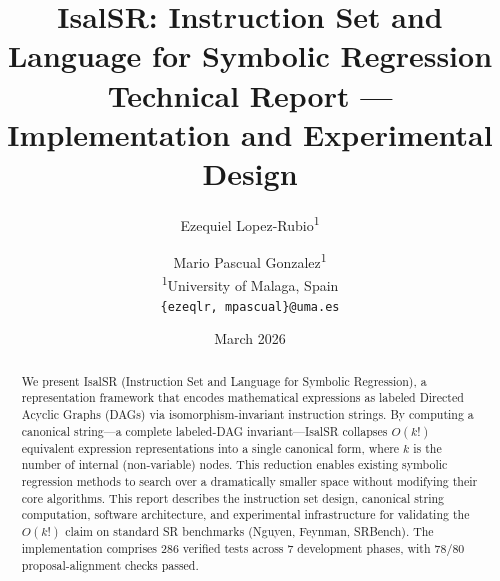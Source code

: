 \documentclass[11pt,a4paper]{article}
\title{IsalSR: Instruction Set and Language for Symbolic Regression\\[6pt]
\large Technical Report --- Implementation and Experimental Design}
\author{
  Ezequiel Lopez-Rubio\textsuperscript{1} \and
  Mario Pascual Gonzalez\textsuperscript{1} \\[6pt]
  \textsuperscript{1}University of Malaga, Spain \\
  \texttt{\{ezeqlr, mpascual\}@uma.es}
}
\date{March 2026}
\begin{document}
\maketitle

\begin{abstract}
We present IsalSR (Instruction Set and Language for Symbolic Regression),
a representation framework that encodes mathematical expressions as labeled
Directed Acyclic Graphs (DAGs) via isomorphism-invariant instruction strings.
By computing a canonical string---a complete labeled-DAG invariant---IsalSR
collapses $O(k!)$ equivalent expression representations into a single
canonical form, where $k$ is the number of internal (non-variable) nodes.
This reduction enables existing symbolic regression methods to search over a
dramatically smaller space without modifying their core algorithms.
This report describes the instruction set design, canonical string computation,
software architecture, and experimental infrastructure for validating the
$O(k!)$ claim on standard SR benchmarks (Nguyen, Feynman, SRBench).
The implementation comprises 286 verified tests across 7 development phases,
with 78/80 proposal-alignment checks passed.
\end{abstract}










\end{document}
